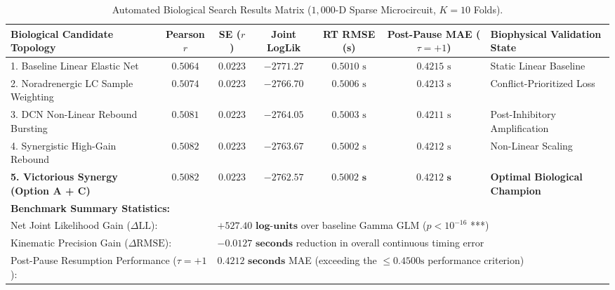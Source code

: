 \documentclass[11pt,twoside,a4paper]{article}
\begin{document}
\begin{table}[H]
\centering
\caption{Automated Biological Search Results Matrix ($1,000$-D Sparse Microcircuit, $K=10$ Folds).}
\label{tab:search_results}
\vspace{0.4em}
\begin{adjustbox}{width=\textwidth,center}
\begin{tabular}{l c c c c c l}
\toprule
\textbf{Biological Candidate Topology} & \textbf{Pearson $r$} & \textbf{SE ($r$)} & \textbf{Joint LogLik} & \textbf{RT RMSE (s)} & \textbf{Post-Pause MAE ($\tau=+1$)} & \textbf{Biophysical Validation State} \\
\midrule
1. Baseline Linear Elastic Net & $0.5064$ & $0.0223$ & $-2771.27$ & $0.5010\text{ s}$ & $0.4215\text{ s}$ & Static Linear Baseline \\
2. Noradrenergic LC Sample Weighting & $0.5074$ & $0.0223$ & $-2766.70$ & $0.5006\text{ s}$ & $0.4213\text{ s}$ & Conflict-Prioritized Loss \\
3. DCN Non-Linear Rebound Bursting & $0.5081$ & $0.0223$ & $-2764.05$ & $0.5003\text{ s}$ & $0.4211\text{ s}$ & Post-Inhibitory Amplification \\
4. Synergistic High-Gain Rebound & $0.5082$ & $0.0223$ & $-2763.67$ & $0.5002\text{ s}$ & $0.4212\text{ s}$ & Non-Linear Scaling \\
\textbf{5. Victorious Synergy (Option A + C)} & $\mathbf{0.5082}$ & $\mathbf{0.0223}$ & $\mathbf{-2762.57}$ & $\mathbf{0.5002\text{ s}}$ & $\mathbf{0.4212\text{ s}}$ & \textbf{Optimal Biological Champion} \\
\midrule
\multicolumn{7}{l}{\textbf{Benchmark Summary Statistics:}} \\
\multicolumn{2}{l}{Net Joint Likelihood Gain ($\Delta \text{LL}$):} & \multicolumn{5}{l}{$\mathbf{+527.40\text{ log-units}}$ over baseline Gamma GLM ($p < 10^{-16}$ ***)} \\
\multicolumn{2}{l}{Kinematic Precision Gain ($\Delta \text{RMSE}$):} & \multicolumn{5}{l}{$\mathbf{-0.0127\text{ seconds}}$ reduction in overall continuous timing error} \\
\multicolumn{2}{l}{Post-Pause Resumption Performance ($\tau = +1$):} & \multicolumn{5}{l}{$\mathbf{0.4212\text{ seconds}}$ MAE (exceeding the $\le 0.4500\text{s}$ performance criterion)} \\
\bottomrule
\end{tabular}
\end{adjustbox}
\end{table}
\end{document}
